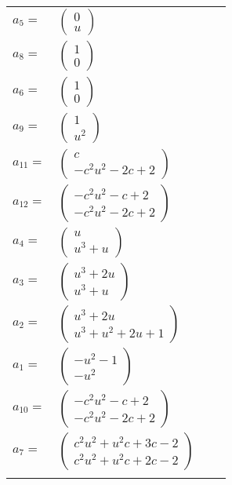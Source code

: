 \documentclass[1p]{elsarticle_modified}
\theoremstyle{definition}
\begin{document}
\begin{tabular}{m{7pt} m{180pt} m{7pt} m{180pt} }
\flushright $a_{5}=$&$\begin{pmatrix}0\\u\end{pmatrix}$ \\
\flushright $a_{8}=$&$\begin{pmatrix}1\\0\end{pmatrix}$ \\
\flushright $a_{6}=$&$\begin{pmatrix}1\\0\end{pmatrix}$ \\
\flushright $a_{9}=$&$\begin{pmatrix}1\\u^2\end{pmatrix}$ \\
\flushright $a_{11}=$&$\begin{pmatrix}c\\- c^2 u^2-2 c+2\end{pmatrix}$ \\
\flushright $a_{12}=$&$\begin{pmatrix}- c^2 u^2- c+2\\- c^2 u^2-2 c+2\end{pmatrix}$ \\
\flushright $a_{4}=$&$\begin{pmatrix}u\\u^3+u\end{pmatrix}$ \\
\flushright $a_{3}=$&$\begin{pmatrix}u^3+2 u\\u^3+u\end{pmatrix}$ \\
\flushright $a_{2}=$&$\begin{pmatrix}u^3+2 u\\u^3+u^2+2 u+1\end{pmatrix}$ \\
\flushright $a_{1}=$&$\begin{pmatrix}- u^2-1\\- u^2\end{pmatrix}$ \\
\flushright $a_{10}=$&$\begin{pmatrix}- c^2 u^2- c+2\\- c^2 u^2-2 c+2\end{pmatrix}$ \\
\flushright $a_{7}=$&$\begin{pmatrix}c^2 u^2+u^2 c+3 c-2\\c^2 u^2+u^2 c+2 c-2\end{pmatrix}$\\&\end{tabular}
\end{document}
